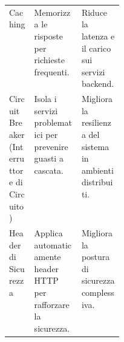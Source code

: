 \begin{table}[htbp]
\begin{tabularx}{\linewidth}{
    >{\raggedright\arraybackslash}p{0.22\linewidth} 
    >{\raggedright\arraybackslash}X                 
    >{\raggedright\arraybackslash}X                 
}
Caching & Memorizza le risposte per richieste frequenti. & Riduce la latenza e il carico sui servizi backend. \\
Circuit Breaker (Interruttore di Circuito) & Isola i servizi problematici per prevenire guasti a cascata. & Migliora la resilienza del sistema in ambienti distribuiti. \\
Header di Sicurezza & Applica automaticamente header HTTP per rafforzare la sicurezza. & Migliora la postura di sicurezza complessiva. \\
\bottomrule
\end{tabularx}
\end{table}